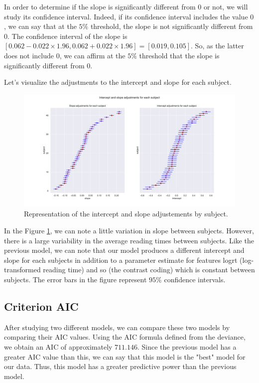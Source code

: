 \documentclass{article}
\begin{document}
In order to determine if the slope is significantly different from $0$ or not, we will study its confidence interval.
Indeed, if its confidence interval includes the value $0$, we can say that at the $5\%$ threshold, the slope is not significantly different from $0$.
The confidence interval of the slope is $[0.062-0.022 \times 1.96, 0.062+0.022 \times 1.96]=[0.019, 0.105]$. So, as the latter does not include $0$, we can affirm at the $5\%$ threshold that the slope is significantly different from $0$.

Let's visualize the adjustments to the intercept and slope for each subject.

\begin{figure}[H]
    \centering
    \includegraphics[scale=.42]{./images/model2_inter.pdf}
    \caption{Representation of the intercept and slope adjustements by subject.}
    \label{fig:model2}
\end{figure}

In the Figure \ref{fig:model2}, we can note a little variation in slope between subjects. However, there is a large variability in the average reading times between subjects. Like the previous model, we can note that our model produces a different intercept and slope for each subjects in addition to a parameter estimate for features logrt (log-transformed reading time) and so (the contrast coding) which is constant between subjects. The error bars in the figure represent $95\%$ confidence intervals.

\subsection{Criterion AIC}
After studying two different models, we can compare these two models by comparing their AIC values.
Using the AIC formula defined from the deviance, we obtain an AIC of approximately $711.146$. 
Since the previous model has a greater AIC value than this, we can say that this model is the "best" model for our data. Thus, this model has a greater predictive power than the previous model.
\end{document}
